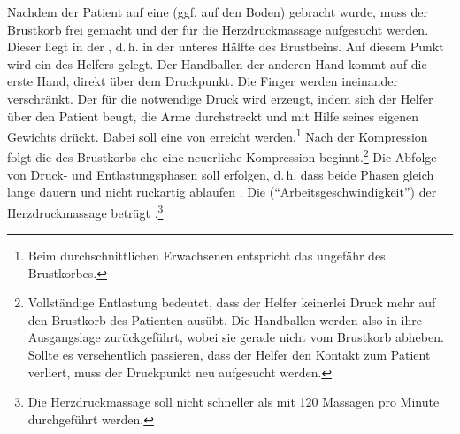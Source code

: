 {%
%  
%  
%  
%
Nachdem der Patient auf eine  (ggf. auf den Boden) gebracht wurde, muss der Brustkorb frei gemacht und der  für die Herzdruckmassage aufgesucht werden. Dieser liegt in der , d.\,h. in der unteres Hälfte des Brustbeins. Auf diesem Punkt wird ein  des Helfers gelegt. Der Handballen der anderen Hand kommt auf die erste Hand, direkt über dem Druckpunkt. Die Finger werden ineinander verschränkt. Der für die  notwendige Druck wird erzeugt, indem sich der Helfer über den Patient beugt, die Arme durchstreckt und mit Hilfe seines eigenen Gewichts  drückt. Dabei soll eine  von   erreicht werden.\footnote{Beim durchschnittlichen Erwachsenen entspricht das ungefähr  des Brustkorbes.} Nach der Kompression folgt die  des Brustkorbs ehe eine neuerliche Kompression beginnt.\footnote{Vollständige Entlastung bedeutet, dass der Helfer keinerlei Druck mehr auf den Brustkorb des Patienten ausübt. Die Handballen werden also in ihre Ausgangslage zurückgeführt, wobei sie gerade nicht vom Brustkorb abheben. Sollte es versehentlich passieren, dass der Helfer den Kontakt zum Patient verliert, muss der Druckpunkt neu aufgesucht werden.} Die Abfolge von Druck- und Entlastungsphasen soll  erfolgen, d.\,h. dass beide Phasen gleich lange dauern und nicht ruckartig ablaufen \cite{Erc2010Sec2}. Die  (\enquote{Arbeitsgeschwindigkeit}) der Herzdruckmassage beträgt .\footnote{Die Herzdruckmassage soll nicht schneller als mit 120 Massagen pro Minute durchgeführt werden.}

}
